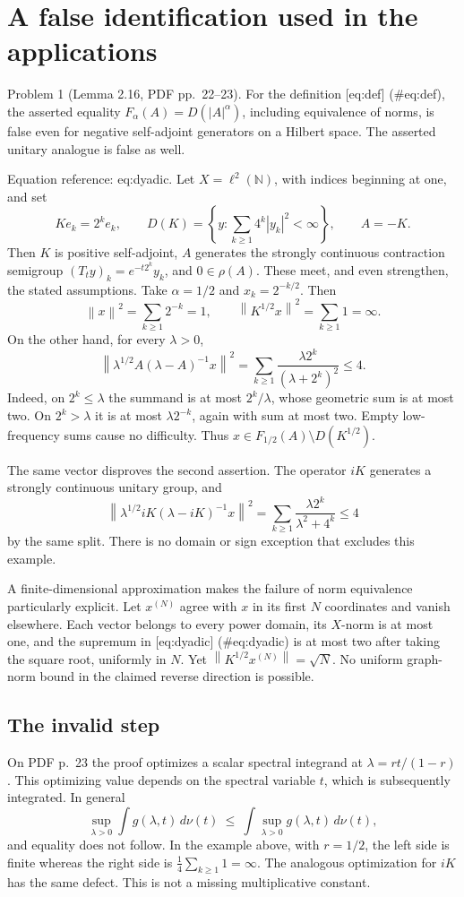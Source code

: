 \documentclass[10pt]{article}
\begin{document}
\section*{A false identification used in the applications}
Problem 1 (Lemma 2.16, PDF pp. 22–23).  For the definition [eq:def] (\#eq:def), the asserted equality \(F_\alpha(A)=D(|A|^\alpha)\), including equivalence of norms, is false even for negative self-adjoint generators on a Hilbert space. The asserted unitary analogue is false as well.\par
Equation reference: eq:dyadic. Let \(X=\ell^2(\mathbb N)\), with indices beginning at one, and set \[Ke_k=2^ke_k,\qquad
 D(K)=\left\{y:\sum_{k\ge1}4^k|y_k|^2<\infty\right\},\qquad A=-K .\] Then \(K\) is positive self-adjoint, \(A\) generates the strongly continuous contraction semigroup \((T_ty)_k=e^{-t2^k}y_k\), and \(0\in\rho(A)\). These meet, and even strengthen, the stated assumptions. Take \(\alpha=1/2\) and \(x_k=2^{-k/2}\). Then \[\left\lVert x\right\rVert^2=\sum_{k\ge1}2^{-k}=1,\qquad
 \left\lVert K^{1/2}x\right\rVert^2=\sum_{k\ge1}1=\infty .\] On the other hand, for every \(\lambda>0\), \[\left\lVert\lambda^{1/2}A(\lambda-A)^{-1}x\right\rVert^2
 =\sum_{k\ge1}\frac{\lambda2^k}{(\lambda+2^k)^2}\le4.
 \tag{3.1}\] Indeed, on \(2^k\le\lambda\) the summand is at most \(2^k/\lambda\), whose geometric sum is at most two. On \(2^k>\lambda\) it is at most \(\lambda2^{-k}\), again with sum at most two. Empty low-frequency sums cause no difficulty. Thus \(x\in F_{1/2}(A)\setminus D(K^{1/2})\).\par
The same vector disproves the second assertion. The operator \(iK\) generates a strongly continuous unitary group, and \[\left\lVert\lambda^{1/2}iK(\lambda-iK)^{-1}x\right\rVert^2
 =\sum_{k\ge1}\frac{\lambda2^k}{\lambda^2+4^k}\le4\] by the same split. There is no domain or sign exception that excludes this example.\par
A finite-dimensional approximation makes the failure of norm equivalence particularly explicit. Let \(x^{(N)}\) agree with \(x\) in its first \(N\) coordinates and vanish elsewhere. Each vector belongs to every power domain, its \(X\)-norm is at most one, and the supremum in [eq:dyadic] (\#eq:dyadic) is at most two after taking the square root, uniformly in \(N\). Yet \(\left\lVert K^{1/2}x^{(N)}\right\rVert=\sqrt N\). No uniform graph-norm bound in the claimed reverse direction is possible.\par
\subsection*{The invalid step}
On PDF p. 23 the proof optimizes a scalar spectral integrand at \(\lambda=r t/(1-r)\). This optimizing value depends on the spectral variable \(t\), which is subsequently integrated. In general \[\sup_{\lambda>0}\int g(\lambda,t)\,d\nu(t)
 \ \le\ \int\sup_{\lambda>0}g(\lambda,t)\,d\nu(t),\] and equality does not follow. In the example above, with \(r=1/2\), the left side is finite whereas the right side is \(\tfrac14\sum_{k\ge1}1=\infty\). The analogous optimization for \(iK\) has the same defect. This is not a missing multiplicative constant.\par
\end{document}

